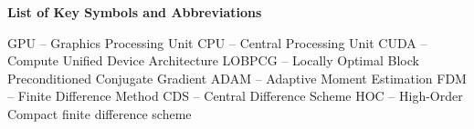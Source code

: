 \noindent
\begingroup
    \fontsize{12pt}{1.5pt}\selectfont
    \textbf{List of Key Symbols and Abbreviations}
\endgroup

\vspace{3mm}

\noindent GPU -- Graphics Processing Unit\newline
CPU -- Central Processing Unit\newline
CUDA -- Compute Unified Device Architecture\newline
LOBPCG -- Locally Optimal Block Preconditioned Conjugate Gradient\newline
ADAM -- Adaptive Moment Estimation\newline
FDM -- Finite Difference Method\newline
CDS -- Central Difference Scheme\newline
HOC -- High-Order Compact finite difference scheme




